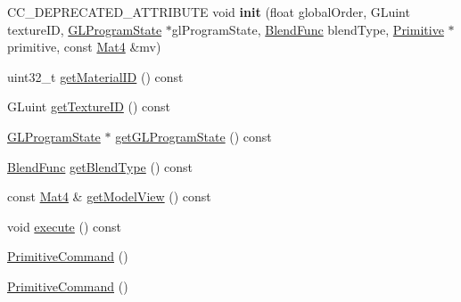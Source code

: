 \begin{DoxyCompactItemize}
\item 
\mbox{\label{classPrimitiveCommand_ac85ac4d861a23285f4a48be61029b2e2}} 
C\+C\+\_\+\+D\+E\+P\+R\+E\+C\+A\+T\+E\+D\+\_\+\+A\+T\+T\+R\+I\+B\+U\+TE void {\bfseries init} (float global\+Order, G\+Luint texture\+ID, \hyperlink{classGLProgramState}{G\+L\+Program\+State} $\ast$gl\+Program\+State, \hyperlink{structBlendFunc}{Blend\+Func} blend\+Type, \hyperlink{classPrimitive}{Primitive} $\ast$primitive, const \hyperlink{classMat4}{Mat4} \&mv)
\item 
uint32\+\_\+t \hyperlink{classPrimitiveCommand_a524b9922884e50c3512a5064ecf1514d}{get\+Material\+ID} () const
\item 
G\+Luint \hyperlink{classPrimitiveCommand_a151c18f3e3969178df27e862dda4a7ad}{get\+Texture\+ID} () const
\item 
\hyperlink{classGLProgramState}{G\+L\+Program\+State} $\ast$ \hyperlink{classPrimitiveCommand_a0045e39f2f8fa3cab081bacc6ddac422}{get\+G\+L\+Program\+State} () const
\item 
\hyperlink{structBlendFunc}{Blend\+Func} \hyperlink{classPrimitiveCommand_a132bf1c144f322b06dce2db6924ebab3}{get\+Blend\+Type} () const
\item 
const \hyperlink{classMat4}{Mat4} \& \hyperlink{classPrimitiveCommand_a3625a2289ce8069914ce790b7ac7d29a}{get\+Model\+View} () const
\item 
void \hyperlink{classPrimitiveCommand_aeac9906f9e9ea410c5cc701c17be80fd}{execute} () const
\end{DoxyCompactItemize}
\textbf{ }\par
\begin{DoxyCompactItemize}
\item 
\hyperlink{classPrimitiveCommand_a1f7d6e04c76c87b9d03833be7de76ea9}{Primitive\+Command} ()
\end{DoxyCompactItemize}

\textbf{ }\par
\begin{DoxyCompactItemize}
\item 
\hyperlink{classPrimitiveCommand_ab8f1ab4e3d899f9ee8e72c12e117b7c8}{Primitive\+Command} ()
\end{DoxyCompactItemize}


